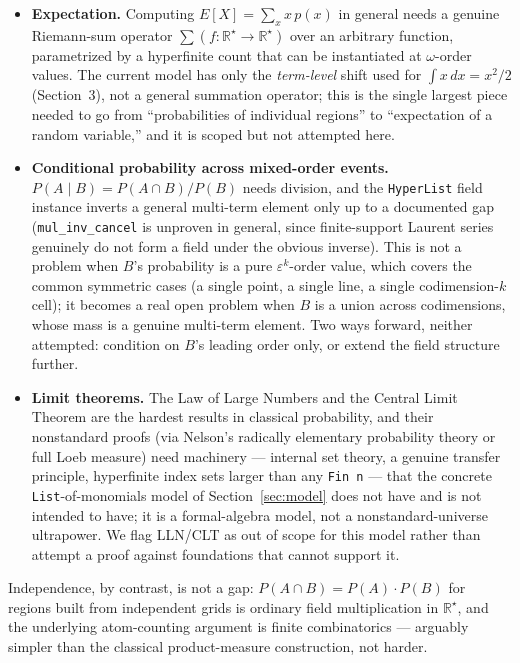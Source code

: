 \documentclass[11pt]{article}
\theoremstyle{definition}
\theoremstyle{remark}
\newcommand{\Rstar}{\mathbb{R}^{\star}}
\newcommand{\eps}{\varepsilon}
\begin{document}
\begin{itemize}
\item \textbf{Expectation.} Computing $E[X] = \sum_x x\,p(x)$ in general
needs a genuine Riemann-sum operator $\sum(f : \Rstar\to\Rstar)$ over an
arbitrary function, parametrized by a hyperfinite count that can be
instantiated at $\omega$-order values. The current model has only the
\emph{term-level} shift used for $\int x\,dx = x^2/2$ (Section~3), not a
general summation operator; this is the single largest piece needed to go
from ``probabilities of individual regions'' to ``expectation of a random
variable,'' and it is scoped but not attempted here.
\item \textbf{Conditional probability across mixed-order events.}
$P(A\mid B) = P(A\cap B)/P(B)$ needs division, and the \texttt{HyperList}
field instance inverts a general multi-term element only up to a
documented gap (\texttt{mul\_inv\_cancel} is unproven in general, since
finite-support Laurent series genuinely do not form a field under the
obvious inverse). This is not a problem when $B$'s probability is a pure
$\eps^{k}$-order value, which covers the common symmetric cases (a single
point, a single line, a single codimension-$k$ cell); it becomes a real
open problem when $B$ is a union across codimensions, whose mass is a
genuine multi-term element. Two ways forward, neither attempted: condition
on $B$'s leading order only, or extend the field structure further.
\item \textbf{Limit theorems.} The Law of Large Numbers and the Central
Limit Theorem are the hardest results in classical probability, and their
nonstandard proofs (via Nelson's radically elementary probability theory or
full Loeb measure) need machinery --- internal set theory, a genuine
transfer principle, hyperfinite index sets larger than any \texttt{Fin n}
--- that the concrete \texttt{List}-of-monomials model of
Section~\ref{sec:model} does not have and is not intended to have; it is a
formal-algebra model, not a nonstandard-universe ultrapower. We flag LLN/CLT
as out of scope for this model rather than attempt a proof against
foundations that cannot support it.
\end{itemize}

Independence, by contrast, is not a gap: $P(A\cap B) = P(A)\cdot P(B)$ for
regions built from independent grids is ordinary field multiplication in
$\Rstar$, and the underlying atom-counting argument is finite combinatorics
--- arguably simpler than the classical product-measure construction, not
harder.
\end{document}
